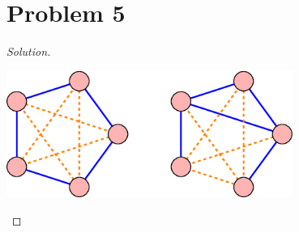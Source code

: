 \section*{Problem 5}
	\begin{proof}[Solution]
		\mbox{}\\
		\begin{center}
			\includegraphics[width=0.7\textwidth]{SCG.png}
		\end{center}
	\end{proof}